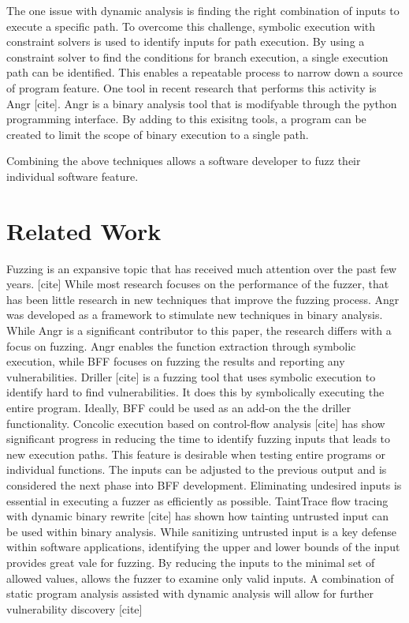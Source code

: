 \documentclass[conference]{IEEEtran}
\begin{document}
The one issue with dynamic analysis is finding the right combination of inputs to execute a specific path. To overcome this challenge, symbolic execution with constraint solvers is used to identify inputs for path execution. By using a constraint solver to find the conditions for branch execution, a single execution path can be identified. This enables a repeatable process to narrow down a source of program feature. One tool in recent research that performs this activity is Angr [cite]. Angr is a binary analysis tool that is modifyable through the python programming interface. By adding to this exisitng tools, a program can be created to limit the scope of binary execution to a single path.

Combining the above techniques allows a software developer to fuzz their individual software feature. 

\section{Related Work}
Fuzzing is an expansive topic that has received much attention over the past few years. [cite] While most research focuses on the performance of the fuzzer, that has been little research in new techniques that improve the fuzzing process. Angr was developed as a framework to stimulate new techniques in binary analysis. While Angr is a significant contributor to this paper, the research differs with a focus on fuzzing. Angr enables the function extraction through symbolic execution, while BFF focuses on fuzzing the results and reporting any vulnerabilities. Driller [cite] is a fuzzing tool that uses symbolic execution to identify hard to find vulnerabilities. It does this by symbolically executing the entire program. Ideally, BFF could be used as an add-on the the driller functionality. Concolic execution based on control-flow analysis [cite] has show significant progress in reducing the time to identify fuzzing inputs that leads to new execution paths. This feature is desirable when testing entire programs or individual functions. The inputs can be adjusted to the previous output and is considered the next phase into BFF development. Eliminating undesired inputs is essential in executing a fuzzer as efficiently as possible. TaintTrace flow tracing with dynamic binary rewrite [cite] has shown how tainting untrusted input can be used within binary analysis. While sanitizing untrusted input is a key defense within software applications, identifying the upper and lower bounds of the input provides great vale for fuzzing. By reducing the inputs to the minimal set of allowed values, allows the fuzzer to examine only valid inputs. A combination of static program analysis assisted with dynamic analysis will allow for further vulnerability discovery [cite]
\end{document}
